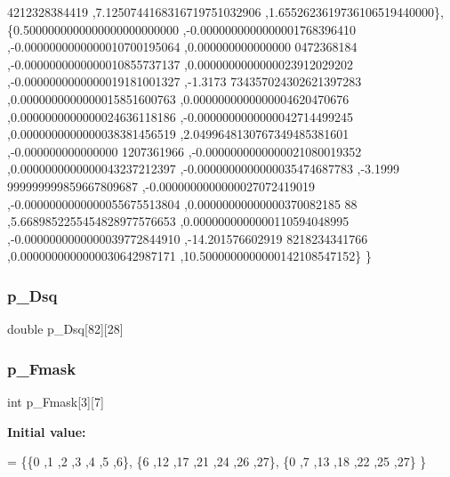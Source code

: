 \begin{DoxyCode}
      4212328384419 ,7.1250744168316719751032906 ,1.6552623619736106519440000\},
\{0.5000000000000000000000000 ,-0.0000000000000001768396410 ,-0.0000000000000010700195064 ,0.000000000000000
      0472368184 ,-0.0000000000000010855737137 ,0.0000000000000023912029202 ,-0.0000000000000019181001327 ,-1.3173
      734357024302621397283 ,0.0000000000000015851600763 ,0.0000000000000004620470676 ,0.0000000000000024636118186
       ,-0.0000000000000042714499245 ,0.0000000000000038381456519 ,2.0499648130767349485381601 ,-0.000000000000000
      1207361966 ,-0.0000000000000021080019352 ,0.0000000000000043237212397 ,-0.0000000000000035474687783 ,-3.1999
      999999999859667809687 ,-0.0000000000000027072419019 ,-0.0000000000000055675513804 ,0.00000000000000370082185
      88 ,5.6689852255454828977576653 ,0.0000000000000110594048995 ,-0.0000000000000039772844910 ,-14.201576602919
      8218234341766 ,0.0000000000000030642987171 ,10.5000000000000142108547152\}
\}
\end{DoxyCode}
\mbox{\label{a00461_a78f9421bebf94c1c908141525844f949}} 
\subsubsection{\texorpdfstring{p\+\_\+\+Dsq}{p\_Dsq}}
{\footnotesize\ttfamily double p\+\_\+\+Dsq\mbox{[}82\mbox{]}\mbox{[}28\mbox{]}}

\mbox{\label{a00461_a6b18ffc6e470dc9d5903792503239300}} 
\subsubsection{\texorpdfstring{p\+\_\+\+Fmask}{p\_Fmask}}
{\footnotesize\ttfamily int p\+\_\+\+Fmask\mbox{[}3\mbox{]}\mbox{[}7\mbox{]}}

{\bfseries Initial value\+:}
\begin{DoxyCode}
= \{\{0 ,1 ,2 ,3 ,4 ,5 ,6\},
\{6 ,12 ,17 ,21 ,24 ,26 ,27\},
\{0 ,7 ,13 ,18 ,22 ,25 ,27\}
\}
\end{DoxyCode}
\mbox{\label{a00461_a240743866e0fdfc2ade414eedd98fde2}} 
